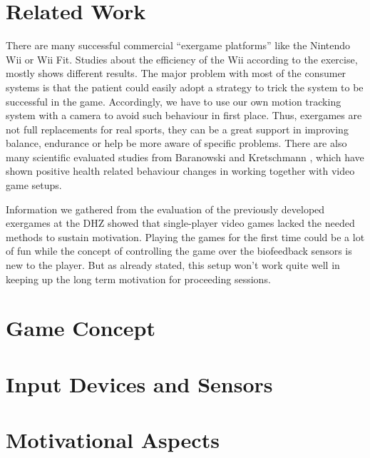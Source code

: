\begin{multicols}{2}
\section{Related Work}
There are many successful commercial “exergame platforms” like the Nintendo Wii or Wii Fit. Studies about the efficiency of the Wii according to the exercise, mostly shows different results. \cite{Baranowski2012} The major problem with most of the consumer systems is that the patient could easily adopt a strategy to trick the system to be successful in the game. Accordingly, we have to use our own motion tracking system with a camera to avoid such behaviour in first place. Thus, exergames are not full replacements for real sports, they can be a great support in improving balance, endurance or help be more aware of specific problems. There are also many scientific evaluated studies from Baranowski \cite{Baranowski2008} and Kretschmann \cite{Kretschmann2010}, which have shown positive health related behaviour changes in working together with video game setups.

Information we gathered from the evaluation of the previously developed exergames at the DHZ showed that single-player video games lacked the needed methods to sustain motivation. Playing the games for the first time could be a lot of fun while the concept of controlling the game over the biofeedback sensors is new to the player. But as already stated, this setup won't work quite well in keeping up the long term motivation for proceeding sessions.

\section{Game Concept}


\section{Input Devices and Sensors}


\section{Motivational Aspects}


\end{multicols}
